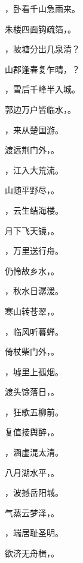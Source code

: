 \documentclass[12pt, a4paper, addpoints]{exam}
\begin{document}
\begin{questions}
\question[1] \uline{\qquad\qquad\qquad}，卧看千山急雨来。

\question[1] 朱楼四面钩疏箔，\uline{\qquad\qquad\qquad}。

\question[1] \uline{\qquad\qquad\qquad}，陂塘分出几泉清？

\question[1] 山郡逢春复乍晴，\uline{\qquad\qquad\qquad}？

\question[1] \uline{\qquad\qquad\qquad}，雪后千峰半入城。

\question[1] 郭边万户皆临水，\uline{\qquad\qquad\qquad}。

\question[1] \uline{\qquad\qquad\qquad}，来从楚国游。

\question[1] 渡远荆门外，\uline{\qquad\qquad\qquad}。

\question[1] \uline{\qquad\qquad\qquad}，江入大荒流。

\question[1] 山随平野尽，\uline{\qquad\qquad\qquad}。

\question[1] \uline{\qquad\qquad\qquad}，云生结海楼。

\question[1] 月下飞天镜，\uline{\qquad\qquad\qquad}。

\question[1] \uline{\qquad\qquad\qquad}，万里送行舟。

\question[1] 仍怜故乡水，\uline{\qquad\qquad\qquad}。

\question[1] \uline{\qquad\qquad\qquad}，秋水日潺湲。

\question[1] 寒山转苍翠，\uline{\qquad\qquad\qquad}。

\question[1] \uline{\qquad\qquad\qquad}，临风听暮蝉。

\question[1] 倚杖柴门外，\uline{\qquad\qquad\qquad}。

\question[1] \uline{\qquad\qquad\qquad}，墟里上孤烟。

\question[1] 渡头馀落日，\uline{\qquad\qquad\qquad}。

\question[1] \uline{\qquad\qquad\qquad}，狂歌五柳前。

\question[1] 复值接舆醉，\uline{\qquad\qquad\qquad}。

\question[1] \uline{\qquad\qquad\qquad}，涵虚混太清。

\question[1] 八月湖水平，\uline{\qquad\qquad\qquad}。

\question[1] \uline{\qquad\qquad\qquad}，波撼岳阳城。

\question[1] 气蒸云梦泽，\uline{\qquad\qquad\qquad}。

\question[1] \uline{\qquad\qquad\qquad}，端居耻圣明。

\question[1] 欲济无舟楫，\uline{\qquad\qquad\qquad}。


\end{questions}
\end{document}
